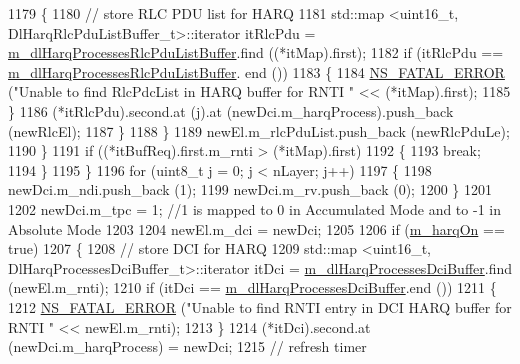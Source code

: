 \begin{DoxyCode}
1179                     \{
1180                       \textcolor{comment}{// store RLC PDU list for HARQ}
1181                       std::map <uint16\_t, DlHarqRlcPduListBuffer\_t>::iterator itRlcPdu =  
      \hyperlink{classns3_1_1TdMtFfMacScheduler_a5c8ba74976d19c98462ea970613b644b}{m\_dlHarqProcessesRlcPduListBuffer}.find ((*itMap).first);
1182                       \textcolor{keywordflow}{if} (itRlcPdu == \hyperlink{classns3_1_1TdMtFfMacScheduler_a5c8ba74976d19c98462ea970613b644b}{m\_dlHarqProcessesRlcPduListBuffer}.
      end ())
1183                         \{
1184                           \hyperlink{group__fatal_ga5131d5e3f75d7d4cbfd706ac456fdc85}{NS\_FATAL\_ERROR} (\textcolor{stringliteral}{"Unable to find RlcPdcList in HARQ buffer for RNTI 
      "} << (*itMap).first);
1185                         \}
1186                       (*itRlcPdu).second.at (j).at (newDci.m\_harqProcess).push\_back (newRlcEl);
1187                     \}
1188                 \}
1189               newEl.m\_rlcPduList.push\_back (newRlcPduLe);
1190             \}
1191           \textcolor{keywordflow}{if} ((*itBufReq).first.m\_rnti > (*itMap).first)
1192             \{
1193               \textcolor{keywordflow}{break};
1194             \}
1195         \}
1196       \textcolor{keywordflow}{for} (uint8\_t j = 0; j < nLayer; j++)
1197         \{
1198           newDci.m\_ndi.push\_back (1);
1199           newDci.m\_rv.push\_back (0);
1200         \}
1201 
1202       newDci.m\_tpc = 1; \textcolor{comment}{//1 is mapped to 0 in Accumulated Mode and to -1 in Absolute Mode}
1203 
1204       newEl.m\_dci = newDci;
1205 
1206       \textcolor{keywordflow}{if} (\hyperlink{classns3_1_1TdMtFfMacScheduler_af0253034544a704cb4d8583fae9377a3}{m\_harqOn} == \textcolor{keyword}{true})
1207         \{
1208           \textcolor{comment}{// store DCI for HARQ}
1209           std::map <uint16\_t, DlHarqProcessesDciBuffer\_t>::iterator itDci = 
      \hyperlink{classns3_1_1TdMtFfMacScheduler_ac1da1d9622aa19e81514421bd668bd63}{m\_dlHarqProcessesDciBuffer}.find (newEl.m\_rnti);
1210           \textcolor{keywordflow}{if} (itDci == \hyperlink{classns3_1_1TdMtFfMacScheduler_ac1da1d9622aa19e81514421bd668bd63}{m\_dlHarqProcessesDciBuffer}.end ())
1211             \{
1212               \hyperlink{group__fatal_ga5131d5e3f75d7d4cbfd706ac456fdc85}{NS\_FATAL\_ERROR} (\textcolor{stringliteral}{"Unable to find RNTI entry in DCI HARQ buffer for RNTI "} << 
      newEl.m\_rnti);
1213             \}
1214           (*itDci).second.at (newDci.m\_harqProcess) = newDci;
1215           \textcolor{comment}{// refresh timer}

\end{DoxyCode}
